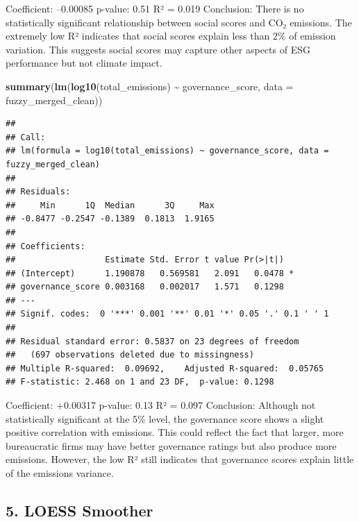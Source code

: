 \documentclass[
]{article}
\newenvironment{Shaded}{\begin{snugshade}}{\end{snugshade}}
\newcommand{\AttributeTok}[1]{\textcolor[rgb]{0.13,0.29,0.53}{#1}}
\newcommand{\FunctionTok}[1]{\textcolor[rgb]{0.13,0.29,0.53}{\textbf{#1}}}
\newcommand{\NormalTok}[1]{#1}
\newcommand{\SpecialCharTok}[1]{\textcolor[rgb]{0.81,0.36,0.00}{\textbf{#1}}}
\begin{document}
Coefficient: --0.00085 p-value: 0.51 R² = 0.019 Conclusion: There is no
statistically significant relationship between social scores and CO₂
emissions. The extremely low R² indicates that social scores explain
less than 2\% of emission variation. This suggests social scores may
capture other aspects of ESG performance but not climate impact.

\begin{Shaded}
\begin{Highlighting}[]
\FunctionTok{summary}\NormalTok{(}\FunctionTok{lm}\NormalTok{(}\FunctionTok{log10}\NormalTok{(total\_emissions) }\SpecialCharTok{\textasciitilde{}}\NormalTok{ governance\_score, }\AttributeTok{data =}\NormalTok{ fuzzy\_merged\_clean))}
\end{Highlighting}
\end{Shaded}

\begin{verbatim}
## 
## Call:
## lm(formula = log10(total_emissions) ~ governance_score, data = fuzzy_merged_clean)
## 
## Residuals:
##     Min      1Q  Median      3Q     Max 
## -0.8477 -0.2547 -0.1389  0.1813  1.9165 
## 
## Coefficients:
##                  Estimate Std. Error t value Pr(>|t|)  
## (Intercept)      1.190878   0.569581   2.091   0.0478 *
## governance_score 0.003168   0.002017   1.571   0.1298  
## ---
## Signif. codes:  0 '***' 0.001 '**' 0.01 '*' 0.05 '.' 0.1 ' ' 1
## 
## Residual standard error: 0.5837 on 23 degrees of freedom
##   (697 observations deleted due to missingness)
## Multiple R-squared:  0.09692,    Adjusted R-squared:  0.05765 
## F-statistic: 2.468 on 1 and 23 DF,  p-value: 0.1298
\end{verbatim}

Coefficient: +0.00317 p-value: 0.13 R² = 0.097 Conclusion: Although not
statistically significant at the 5\% level, the governance score shows a
slight positive correlation with emissions. This could reflect the fact
that larger, more bureaucratic firms may have better governance ratings
but also produce more emissions. However, the low R² still indicates
that governance scores explain little of the emissions variance.

\hypertarget{loess-smoother}{%
\subsection{5. LOESS Smoother}\label{loess-smoother}}
\end{document}
